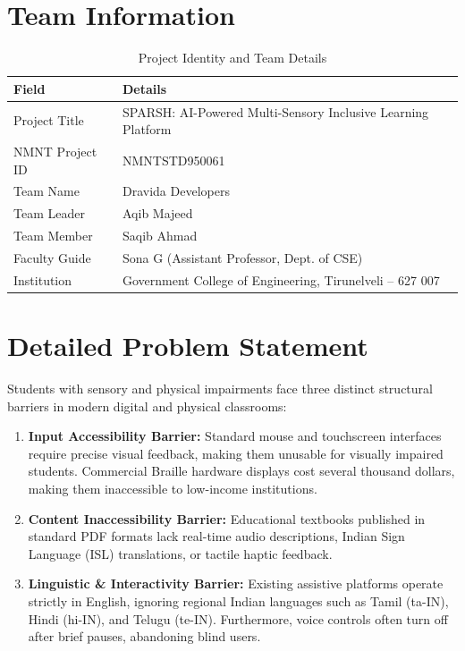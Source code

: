\documentclass[12pt,a4paper]{report}
\begin{document}
\section{Team Information}
\begin{table}[htbp]
    \centering
    \caption{Project Identity and Team Details}
    \vspace{0.2cm}
    \renewcommand{\arraystretch}{1.2}
    \begin{tabular}{|l|l|}
        \hline
        \textbf{Field} & \textbf{Details} \\ \hline
        Project Title & SPARSH: AI-Powered Multi-Sensory Inclusive Learning Platform \\ \hline
        NMNT Project ID & NMNTSTD950061 \\ \hline
        Team Name & Dravida Developers \\ \hline
        Team Leader & Aqib Majeed \\ \hline
        Team Member & Saqib Ahmad \\ \hline
        Faculty Guide & Sona G (Assistant Professor, Dept. of CSE) \\ \hline
        Institution & Government College of Engineering, Tirunelveli -- 627 007 \\ \hline
    \end{tabular}
\end{table}

\section{Detailed Problem Statement}
Students with sensory and physical impairments face three distinct structural barriers in modern digital and physical classrooms:
\begin{enumerate}
    \item \textbf{Input Accessibility Barrier:} Standard mouse and touchscreen interfaces require precise visual feedback, making them unusable for visually impaired students. Commercial Braille hardware displays cost several thousand dollars, making them inaccessible to low-income institutions.
    \item \textbf{Content Inaccessibility Barrier:} Educational textbooks published in standard PDF formats lack real-time audio descriptions, Indian Sign Language (ISL) translations, or tactile haptic feedback.
    \item \textbf{Linguistic \& Interactivity Barrier:} Existing assistive platforms operate strictly in English, ignoring regional Indian languages such as Tamil (ta-IN), Hindi (hi-IN), and Telugu (te-IN). Furthermore, voice controls often turn off after brief pauses, abandoning blind users.
\end{enumerate}
\end{document}
